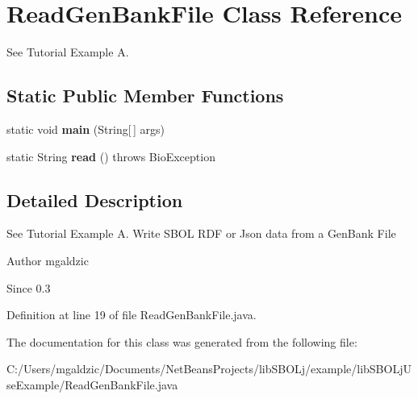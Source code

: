 \hypertarget{classlib_s_b_o_lj_use_example_1_1_read_gen_bank_file}{
\section{ReadGenBankFile Class Reference}
\label{classlib_s_b_o_lj_use_example_1_1_read_gen_bank_file}
}


See Tutorial Example A.  


\subsection*{Static Public Member Functions}
\begin{DoxyCompactItemize}
\item 
\hypertarget{classlib_s_b_o_lj_use_example_1_1_read_gen_bank_file_a8b260eecbaabcef8473fd87ada040682}{
static void {\bfseries main} (String\mbox{[}$\,$\mbox{]} args)}
\label{classlib_s_b_o_lj_use_example_1_1_read_gen_bank_file_a8b260eecbaabcef8473fd87ada040682}

\item 
\hypertarget{classlib_s_b_o_lj_use_example_1_1_read_gen_bank_file_a2dd005111e8579ef27be750c816c4d28}{
static String {\bfseries read} ()  throws BioException }
\label{classlib_s_b_o_lj_use_example_1_1_read_gen_bank_file_a2dd005111e8579ef27be750c816c4d28}

\end{DoxyCompactItemize}


\subsection{Detailed Description}
See Tutorial Example A. Write SBOL RDF or Json data from a GenBank File \begin{DoxyAuthor}{Author}
mgaldzic 
\end{DoxyAuthor}
\begin{DoxySince}{Since}
0.3 
\end{DoxySince}


Definition at line 19 of file ReadGenBankFile.java.



The documentation for this class was generated from the following file:\begin{DoxyCompactItemize}
\item 
C:/Users/mgaldzic/Documents/NetBeansProjects/libSBOLj/example/libSBOLjUseExample/ReadGenBankFile.java\end{DoxyCompactItemize}
